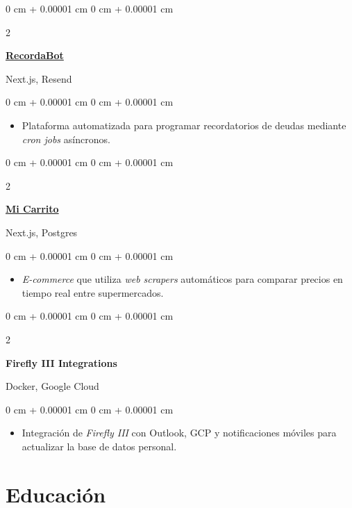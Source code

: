 \documentclass[10pt, letterpaper]{article}
\newenvironment{highlights}{
    \begin{itemize}[
        topsep=0.05 cm,
        parsep=0.05 cm,
        partopsep=0pt,
        itemsep=0pt,
        leftmargin=0 cm + 10pt
    ]
}{
    \end{itemize}
} %
\newenvironment{onecolentry}{
    \begin{adjustwidth}{
        0 cm + 0.00001 cm
    }{
        0 cm + 0.00001 cm
    }
}{
    \end{adjustwidth}
} %
\newenvironment{twocolentry}[2][]{
    \onecolentry
    \def\secondColumn{#2}
    \setcolumnwidth{\fill, 4.0 cm}
    \begin{paracol}{2}
}{
    \switchcolumn \raggedleft \secondColumn
    \end{paracol}
    \endonecolentry
} %
\let\hrefWithoutArrow\href
\begin{document}
    \begin{twocolentry}{\color{gray} Next.js, Resend}
        \textbf{\hrefWithoutArrow{https://recordabot.vercel.app/}{RecordaBot}}
    \end{twocolentry}
    \vspace{0.05 cm}
    \begin{onecolentry}
        \begin{highlights}
            \item Plataforma automatizada para programar recordatorios de deudas mediante \textit{cron jobs} asíncronos.
        \end{highlights}
    \end{onecolentry}
    \vspace{0.1 cm}

    \begin{twocolentry}{\color{gray} Next.js, Postgres}
        \textbf{\hrefWithoutArrow{https://micarritochile.vercel.app/}{Mi Carrito}}
    \end{twocolentry}
    \vspace{0.05 cm}
    \begin{onecolentry}
        \begin{highlights}
            \item \textit{E-commerce} que utiliza \textit{web scrapers} automáticos para comparar precios en tiempo real entre supermercados.
        \end{highlights}
    \end{onecolentry}
    \vspace{0.1 cm}

    \begin{twocolentry}{\color{gray} Docker, Google Cloud}
        \textbf{Firefly III Integrations}
    \end{twocolentry}
    \vspace{0.05 cm}
    \begin{onecolentry}
        \begin{highlights}
            \item Integración de \textit{Firefly III} con Outlook, GCP y notificaciones móviles para actualizar la base de datos personal.
        \end{highlights}
    \end{onecolentry}

    \section{Educación}
\end{document}
